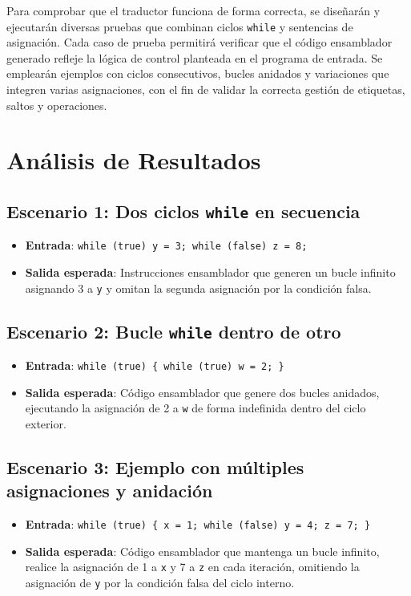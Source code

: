 \documentclass{article}
\begin{document}
Para comprobar que el traductor funciona de forma correcta, se diseñarán y ejecutarán diversas pruebas que combinan ciclos \texttt{while} y sentencias de asignación. Cada caso de prueba permitirá verificar que el código ensamblador generado refleje la lógica de control planteada en el programa de entrada. Se emplearán ejemplos con ciclos consecutivos, bucles anidados y variaciones que integren varias asignaciones, con el fin de validar la correcta gestión de etiquetas, saltos y operaciones.

\section*{Análisis de Resultados}

\subsection*{Escenario 1: Dos ciclos \texttt{while} en secuencia}

\begin{itemize}
    \item \textbf{Entrada}: \texttt{while (true) y = 3; while (false) z = 8;}
    \item \textbf{Salida esperada}: Instrucciones ensamblador que generen un bucle infinito asignando 3 a \texttt{y} y omitan la segunda asignación por la condición falsa.
\end{itemize}

\subsection*{Escenario 2: Bucle \texttt{while} dentro de otro}

\begin{itemize}
    \item \textbf{Entrada}: \texttt{while (true) \{ while (true) w = 2; \}}
    \item \textbf{Salida esperada}: Código ensamblador que genere dos bucles anidados, ejecutando la asignación de 2 a \texttt{w} de forma indefinida dentro del ciclo exterior.
\end{itemize}

\subsection*{Escenario 3: Ejemplo con múltiples asignaciones y anidación}

\begin{itemize}
    \item \textbf{Entrada}: \texttt{while (true) \{ x = 1; while (false) y = 4; z = 7; \}}
    \item \textbf{Salida esperada}: Código ensamblador que mantenga un bucle infinito, realice la asignación de 1 a \texttt{x} y 7 a \texttt{z} en cada iteración, omitiendo la asignación de \texttt{y} por la condición falsa del ciclo interno.
\end{itemize}
\end{document}

